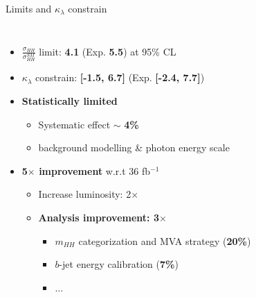 \begin{frame}{Limits and $\kappa_{\lambda}$ constrain}
\begin{columns}
\begin{itemize}
    \item $\frac{\sigma_{HH}}{\sigma_{HH}^{SM}}$ limit: \textbf{\textcolor{HHred}{4.1}} (Exp. \textbf{5.5}) at 95\% CL
    \item $\kappa_{\lambda}$ constrain: \textbf{\textcolor{HHred}{[-1.5, 6.7]}} (Exp. \textbf{[-2.4, 7.7]})
    \pause
    \item \textbf{Statistically limited}
    \begin{itemize}
        \item Systematic effect $\sim$ \textbf{4\%}
        \item background modelling \& photon energy scale
    \end{itemize}
    \pause
    \item \textbf{\textcolor{cadmiumorange}{5$\times$ improvement}} w.r.t 36 fb$^{-1}$
    \begin{itemize}
        \item Increase luminosity: 2$\times$
        \item \textbf{\textcolor{HHturquoise_d}{Analysis improvement: 3$\times$}}
        \begin{itemize}
            \item$m_{HH}$ categorization and MVA strategy (\textbf{20\%})
            \item $b$-jet energy calibration (\textbf{7\%})
            \item ...
        \end{itemize}
    \end{itemize}
    \pause
\end{itemize}
\end{columns}
\end{frame}

